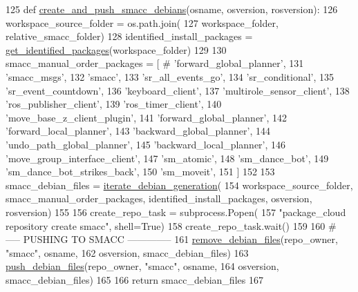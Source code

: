\begin{DoxyCode}
125 \textcolor{keyword}{def }\hyperlink{namespacegenerate__debs_af7237c463c8e5b4df369e6befc154c50}{create\_and\_push\_smacc\_debians}(osname, osversion, rosversion):
126     workspace\_source\_folder = os.path.join(
127         workspace\_folder, relative\_smacc\_folder)
128     identified\_install\_packages = \hyperlink{namespacegenerate__debs_aa91b87c6d9c3ed04015845cc9298431a}{get\_identified\_packages}(workspace\_folder)
129 
130     smacc\_manual\_order\_packages = [  \textcolor{comment}{# 'forward\_global\_planner',}
131         \textcolor{stringliteral}{'smacc\_msgs'},
132         \textcolor{stringliteral}{'smacc'},
133         \textcolor{stringliteral}{'sr\_all\_events\_go'},
134         \textcolor{stringliteral}{'sr\_conditional'},
135         \textcolor{stringliteral}{'sr\_event\_countdown'},
136         \textcolor{stringliteral}{'keyboard\_client'},
137         \textcolor{stringliteral}{'multirole\_sensor\_client'},
138         \textcolor{stringliteral}{'ros\_publisher\_client'},
139         \textcolor{stringliteral}{'ros\_timer\_client'},
140         \textcolor{stringliteral}{'move\_base\_z\_client\_plugin'},
141         \textcolor{stringliteral}{'forward\_global\_planner'},
142         \textcolor{stringliteral}{'forward\_local\_planner'},
143         \textcolor{stringliteral}{'backward\_global\_planner'},
144         \textcolor{stringliteral}{'undo\_path\_global\_planner'},
145         \textcolor{stringliteral}{'backward\_local\_planner'},        
146         \textcolor{stringliteral}{'move\_group\_interface\_client'},
147         \textcolor{stringliteral}{'sm\_atomic'},
148         \textcolor{stringliteral}{'sm\_dance\_bot'},
149         \textcolor{stringliteral}{'sm\_dance\_bot\_strikes\_back'},
150         \textcolor{stringliteral}{'sm\_moveit'},
151     ]
152 
153     smacc\_debian\_files = \hyperlink{namespacegenerate__debs_a2615a6fc7860b6aa9e920e6b4d886589}{iterate\_debian\_generation}(
154         workspace\_source\_folder, smacc\_manual\_order\_packages, identified\_install\_packages, osversion, 
      rosversion)
155 
156     create\_repo\_task = subprocess.Popen(
157         \textcolor{stringliteral}{"package\_cloud repository create smacc"}, shell=\textcolor{keyword}{True})
158     create\_repo\_task.wait()
159 
160     \textcolor{comment}{# ----- PUSHING TO SMACC --------------}
161     \hyperlink{namespacegenerate__debs_a08095040d038b3613ad0e77fd4e7f60e}{remove\_debian\_files}(repo\_owner, \textcolor{stringliteral}{"smacc"},  osname,
162                         osversion, smacc\_debian\_files)
163     \hyperlink{namespacegenerate__debs_a9b22f5ad65b40b7903c467eda308e575}{push\_debian\_files}(repo\_owner, \textcolor{stringliteral}{"smacc"},  osname,
164                       osversion, smacc\_debian\_files)
165 
166     \textcolor{keywordflow}{return} smacc\_debian\_files
167 
\end{DoxyCode}
